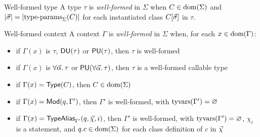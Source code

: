 \begin{AddedBlock}
\begin{specdefinition}{Well-formed type}%
\label{def:well-formed-type}%
A type $\tau$ is \emph{well-formed} in $\Sigma$ when $C \in \mathrm{dom}(\Sigma)$ and $|\seq{\sigma}| =
|\typeParams{\Sigma}(C)|$ for each instantiated class $C[\seq{\sigma}]$ in $\tau$.%
\end{specdefinition}
\begin{specdefinition}{Well-formed context}%
\label{def:well-formed-context}%
A context $\Gamma$ is \emph{well-formed} in $\Sigma$ when, for each $x \in \mathrm{dom}(\Gamma)$:
\begin{itemize}
\item if $\Gamma(x)$ is $\tau$, $\mathsf{DU}(\tau)$ or $\mathsf{PU}(\tau)$, then $\tau$ is well-formed
\item if $\Gamma(x)$ is $\scheme{\seq{\alpha}}{\tau}$ or $\PU{\scheme{\seq{\alpha}}{\tau}}$, then $\tau$ is a well-formed
callable type
\item if $\Gamma(x) = \mathsf{Type}(C)$, then $C \in \mathrm{dom}(\Sigma)$
\item if $\Gamma(x) = \mathsf{Mod}(q, \Gamma')$, then $\Gamma'$ is well-formed, with $\mathrm{tyvars}(\Gamma') = \varnothing$
\item if $\Gamma(x) = \TypeAlias[\Gamma']{q}{\seq{\chi}}{i}$, then $\Gamma'$ is well-formed, with $\mathrm{tyvars}(\Gamma') =
\varnothing$, $\chi_i$ is a  statement, and $q.c \in \mathrm{dom}(\Sigma)$ for each class definition of $c$ in
$\seq{\chi}$
\end{itemize}
%
\end{specdefinition}
\end{AddedBlock}
